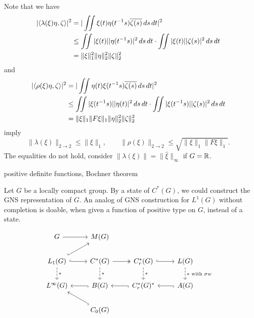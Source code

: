 \documentclass{../../large}
\begin{document}
Note that we have
\begin{align*}
|\langle\lambda(\xi)\eta,\zeta\rangle|^2
&=|\iint\xi(t)\eta(t^{-1}s)\overline{\zeta(s)}\,ds\,dt|^2\\
&\le\iint|\xi(t)||\eta(t^{-1}s)|^2\,ds\,dt\cdot\iint|\xi(t)||\zeta(s)|^2\,ds\,dt\\
&=\|\xi\|_1^2\|\eta\|_2^2\|\zeta\|_2^2
\end{align*}
and
\begin{align*}
|\langle\rho(\xi)\eta,\zeta\rangle|^2
&=|\iint\eta(t)\xi(t^{-1}s)\overline{\zeta(s)}\,ds\,dt|^2\\
&\le\iint|\xi(t^{-1}s)||\eta(t)|^2\,ds\,dt\cdot\iint|\xi(t^{-1}s)||\zeta(s)|^2\,ds\,dt\\
&=\|\xi\|_1\|F\xi\|_1\|\eta\|_2^2\|\zeta\|_2^2
\end{align*}
imply
\[\|\lambda(\xi)\|_{2\to2}\le\|\xi\|_1,\qquad\|\rho(\xi)\|_{2\to2}\le\sqrt{\|\xi\|_1\|F\xi\|_1}.\]
The equalities do not hold, consider $\|\lambda(\xi)\|=\|\hat\xi\|_\infty$ if $G=\mathbb{R}$.

\begin{prb}
\end{prb}
\begin{prb}
\end{prb}

\begin{prb}
\end{prb}
\begin{prb}
positive definite functions, Bochner theorem
\end{prb}
\begin{prb}
Let $G$ be a locally compact group.
By a state of $C^*(G)$, we could construct the GNS representation of $G$.
An analog of GNS construction for $L^1(G)$ without completion is doable, when given a function of positive type on $G$, instead of a state.
\end{prb}


\[\begin{tikzcd}
G \ar{r} & M(G) & \, & \,\\
L_1(G) \ar[hook]{ur}\ar[hook]{r}\ar[dashed]{d}{*} & C^*(G) \ar[two heads]{r}\ar[dashed]{d}{*} & C_r^*(G) \ar[hook]{r}\ar[dashed]{d}{*} & L(G) \ar[dashed]{d}{*\text{ with }\sigma w}\\
L^\infty(G) & B(G) \ar[hook]{l} & C_r^*(G)^* \ar[hook]{l} & A(G) \ar[hook]{l}\\
& C_0(G) \ar[hook]{ul} & &
\end{tikzcd}\]
\end{document}
